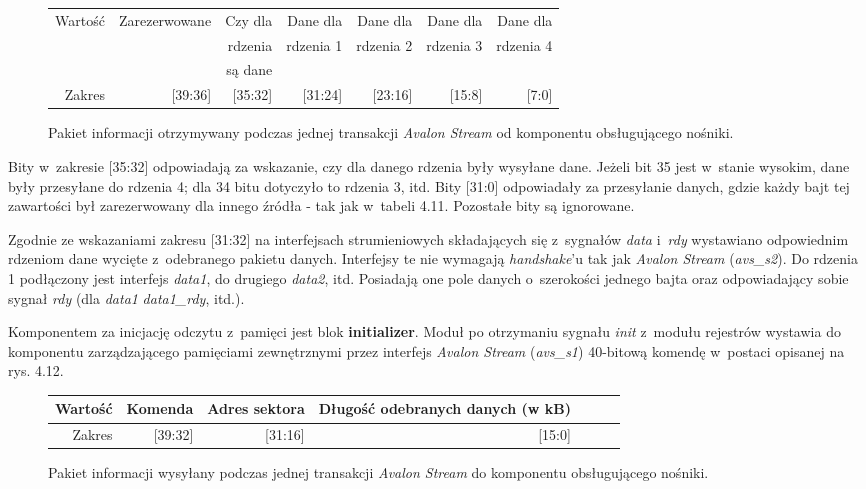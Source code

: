 \begin{figure}[h]
	\centering
	\begin{tabular}{|r|r|r|r|r|r|r|}
		\hline
		Wartość & Zarezerwowane & Czy dla  & Dane dla  & Dane dla  & Dane dla  & Dane dla  \\
		 		&  				& rdzenia  & rdzenia 1 & rdzenia 2 & rdzenia 3 & rdzenia 4 \\
		 		&				& są dane  & 		   & 		   & 		   &			\\
		\hline
		Zakres & [39:36] & [35:32] & [31:24] & [23:16] & [15:8] & [7:0]\\
		\hline
	\end{tabular}
	
	\caption{Pakiet informacji otrzymywany podczas jednej transakcji \textit{Avalon Stream} od komponentu obsługującego nośniki.}
\end{figure}
\FloatBarrier %

Bity w~zakresie [35:32] odpowiadają za wskazanie, czy dla danego rdzenia były wysyłane dane. Jeżeli bit 35 jest w~stanie wysokim, dane były przesyłane do rdzenia 4; dla 34 bitu dotyczyło to rdzenia 3, itd. Bity [31:0] odpowiadały za przesyłanie danych, gdzie każdy bajt tej zawartości był zarezerwowany dla innego źródła - tak jak w~tabeli 4.11. Pozostałe bity są ignorowane.

Zgodnie ze wskazaniami zakresu [31:32] na interfejsach strumieniowych składających się z~sygnałów \textit{data} i~\textit{rdy} wystawiano odpowiednim rdzeniom dane wycięte z~odebranego pakietu danych. Interfejsy te nie wymagają \textit{handshake}'u tak jak \textit{Avalon Stream} (\textit{avs\_s2}). Do rdzenia 1 podłączony jest interfejs \textit{data1}, do drugiego \textit{data2}, itd. Posiadają one pole danych o~szerokości jednego bajta oraz odpowiadający sobie sygnał \textit{rdy} (dla \textit{data1} \textit{data1\_rdy}, itd.).

Komponentem za inicjację odczytu z~pamięci jest blok \textbf{initializer}. Moduł po otrzymaniu sygnału \textit{init} z~modułu rejestrów wystawia do komponentu zarządzającego pamięciami zewnętrznymi przez interfejs \textit{Avalon Stream} (\textit{avs\_s1}) 40-bitową komendę w~postaci opisanej na rys. 4.12.

\begin{figure}[h]
	\centering
	\begin{tabular}{|r|r|r|r|r|r|r|}
		\hline
		Wartość & Komenda & Adres sektora   & Długość odebranych danych (w kB) \\
		\hline
		Zakres & [39:32] & [31:16] & [15:0] \\
		\hline
	\end{tabular}
	
	\caption{Pakiet informacji wysyłany podczas jednej transakcji \textit{Avalon Stream} do komponentu obsługującego nośniki.}
\end{figure}

